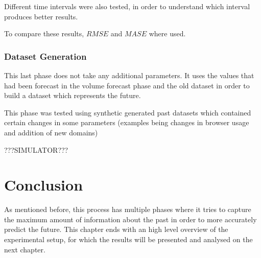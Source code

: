 Different time intervals were also tested, in order to understand which interval
produces better results.

To compare these results, $RMSE$ and $MASE$ where used.

\subsubsection*{Dataset Generation}

This last phase does not take any additional parameters. It uses the values
that had been forecast in the volume forecast phase and the old dataset in order to build
a dataset which represents the future.

This phase was tested using synthetic generated past datasets which contained certain
changes in some parameters (examples being changes in browser usage and addition of new domains)

???SIMULATOR???

\section{Conclusion}

As mentioned before, this process has multiple phases where it tries to capture the
maximum amount of information about the past in order to more accurately predict
the future.
This chapter ends with an high level overview of the experimental setup, for which
the results will be presented and analysed on the next chapter.


